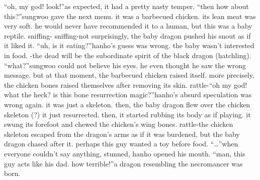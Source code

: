 “oh, my god! look!”as expected, it had a pretty nasty temper.
“then how about this?”sungwoo gave the next menu.
 it was a barbecued chicken.
 its lean meat was very soft.
 he would never have recommended it to a human, but this was a baby reptile.
sniffing- sniffing-not surprisingly, the baby dragon pushed his snout as if it liked it.
“uh, is it eating?”hanho’s guess was wrong.
 the baby wasn’t interested in food.
-the dead will be the subordinate spirit of the black dragon (hatchling).
“what?”sungwoo could not believe his eyes.
 he even thought he saw the wrong message.
but at that moment, the barbecued chicken raised itself.
 more precisely, the chicken bones raised themselves after removing its skin.
rattle-“oh my god! what the heck? is this bone resurrection magic?”hanho’s absurd speculation was wrong again.
 it was just a skeleton.
then, the baby dragon flew over the chicken skeleton (?) it just resurrected.
then, it started rubbing its body as if playing.
 it swung its forefoot and chewed the chicken’s wing bones.
rattle-the chicken skeleton escaped from the dragon’s arms as if it was burdened, but the baby dragon chased after it.
perhaps this guy wanted a toy before food.
“…”when everyone couldn’t say anything, stunned, hanho opened his mouth.
“man, this guy acts like his dad.
 how terrible!”a dragon resembling the necromancer was born.


 